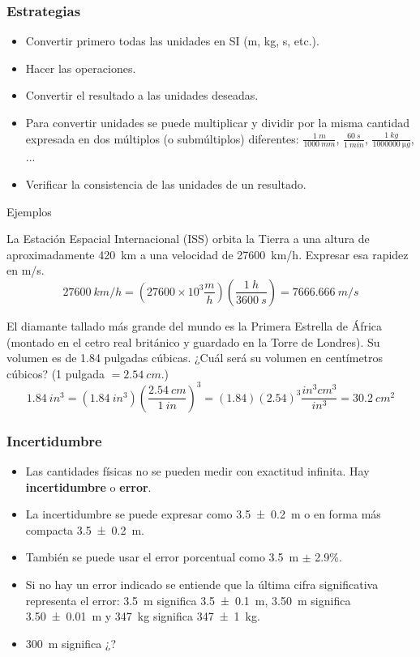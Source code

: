 \documentclass[9pt, aspectratio=169]{beamer}
\begin{document}
\begin{frame}
  \frametitle{Estrategias}
\Large
\begin{itemize}
    \item Convertir primero todas las unidades en SI (\unit{m}, \unit{kg}, \unit{s}, etc.).
 \item Hacer las operaciones.
 \item Convertir el resultado a las unidades deseadas.
 \item Para convertir unidades se puede multiplicar y dividir por la misma cantidad expresada en dos múltiplos (o submúltiplos) diferentes: $\frac{\qty{1}{m}}{\qty{1000}{mm}}$, $\frac{\qty{60}{s}}{\qty{1}{min}}$, $\frac{\qty{1}{kg}}{\qty{1000000}{\micro g}}$, ... 
 \item Verificar la consistencia de las unidades de un resultado.
\end{itemize}
\end{frame}

\begin{frame}{Ejemplos}
\begin{example} 
La Estación Espacial Internacional (ISS) orbita la Tierra a una altura de aproximadamente \qty{420}{km} a una velocidad de \qty{27600}{km/h}. Expresar esa rapidez en \unit{m/s}.
\pause
\[ \qty{27600}{km/h} = \left(\num{27600} \times 10^3 \frac{\unit{m}}{\unit{h}}\right) \left(\frac{\qty{1}{h}}{\qty{3600}{s}}\right) = \qty{7666.666}{m/s} \] 
\end{example}
\pause
\begin{example}
El diamante tallado más grande del mundo es la Primera Estrella de África (montado en el cetro real británico y guardado en la Torre de Londres). Su volumen es de \num{1.84} pulgadas cúbicas. ¿Cuál será su volumen en centímetros cúbicos? (\num{1} pulgada $= \qty{2.54}{cm}$.)
\pause
\[ \qty{1.84}{in^3} = (\qty{1.84}{in^3}) \left(\frac{\qty{2.54}{cm}}{\qty{1}{in}}\right)^3 = (\num{1.84})(\num{2.54})^3 \frac{\unit{in^3} \unit{cm^3}}{\unit{in^3}} = \qty{30.2}{cm^2} \]
\end{example}
\end{frame}

\begin{frame}
  \frametitle{Incertidumbre}
\Large
\begin{itemize}
 \item Las cantidades físicas no se pueden medir con exactitud infinita. Hay {\bf incertidumbre} o {\bf error}.
 \item La incertidumbre se puede expresar como \qty[separate-uncertainty=true]{3.5 \pm 0.2}{m} o en forma más compacta \qty{3.5 \pm 0.2}{m}.
 \item También se puede usar el error porcentual como \qty{3.5}{m} $\pm$  \num{2.9}\%. 
 \item Si no hay un error indicado se entiende que la última cifra significativa representa el error: \qty{3.5}{m} significa \qty{3.5 \pm 0.1}{m}, \qty{3.50}{m} significa \qty{3.50 \pm 0.01}{m} y \qty{347}{kg} significa \qty{347 \pm 1}{kg}.    
 \item \qty{300}{m} significa ¿?
\end{itemize}
\end{frame}
\end{document}
